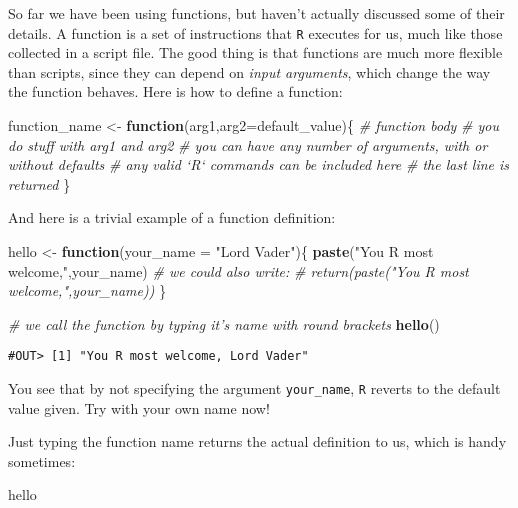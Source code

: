 \documentclass[]{book}
\newenvironment{Shaded}{\begin{snugshade}}{\end{snugshade}}
\newcommand{\KeywordTok}[1]{\textcolor[rgb]{0.13,0.29,0.53}{\textbf{#1}}}
\newcommand{\DataTypeTok}[1]{\textcolor[rgb]{0.13,0.29,0.53}{#1}}
\newcommand{\StringTok}[1]{\textcolor[rgb]{0.31,0.60,0.02}{#1}}
\newcommand{\CommentTok}[1]{\textcolor[rgb]{0.56,0.35,0.01}{\textit{#1}}}
\newcommand{\ControlFlowTok}[1]{\textcolor[rgb]{0.13,0.29,0.53}{\textbf{#1}}}
\newcommand{\NormalTok}[1]{#1}
\begin{document}
So far we have been using functions, but haven't actually discussed some
of their details. A function is a set of instructions that \texttt{R}
executes for us, much like those collected in a script file. The good
thing is that functions are much more flexible than scripts, since they
can depend on \emph{input arguments}, which change the way the function
behaves. Here is how to define a function:

\begin{Shaded}
\begin{Highlighting}[]
\NormalTok{function_name <-}\StringTok{ }\ControlFlowTok{function}\NormalTok{(arg1,}\DataTypeTok{arg2=}\NormalTok{default_value)\{}
  \CommentTok{# function body}
  \CommentTok{# you do stuff with arg1 and arg2}
  \CommentTok{# you can have any number of arguments, with or without defaults}
  \CommentTok{# any valid `R` commands can be included here}
  \CommentTok{# the last line is returned}
\NormalTok{\}}
\end{Highlighting}
\end{Shaded}

And here is a trivial example of a function definition:

\begin{Shaded}
\begin{Highlighting}[]
\NormalTok{hello <-}\StringTok{ }\ControlFlowTok{function}\NormalTok{(}\DataTypeTok{your_name =} \StringTok{"Lord Vader"}\NormalTok{)\{}
  \KeywordTok{paste}\NormalTok{(}\StringTok{"You R most welcome,"}\NormalTok{,your_name)}
  \CommentTok{# we could also write:}
  \CommentTok{# return(paste("You R most welcome,",your_name))}
\NormalTok{\}}

\CommentTok{# we call the function by typing it's name with round brackets}
\KeywordTok{hello}\NormalTok{()}
\end{Highlighting}
\end{Shaded}

\begin{verbatim}
#OUT> [1] "You R most welcome, Lord Vader"
\end{verbatim}

You see that by not specifying the argument \texttt{your\_name},
\texttt{R} reverts to the default value given. Try with your own name
now!

Just typing the function name returns the actual definition to us, which
is handy sometimes:

\begin{Shaded}
\begin{Highlighting}[]
\NormalTok{hello}
\end{Highlighting}
\end{Shaded}
\end{document}
